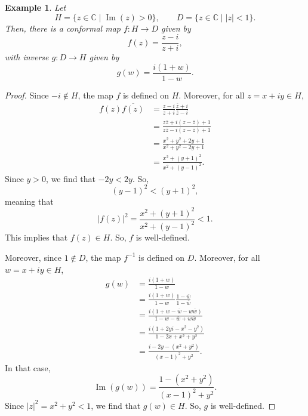 \documentclass[a4paper, openany]{memoir}
\theoremstyle{definition}
\theoremstyle{plain}
\newtheorem{example}[definition]{Example}
\begin{document}
\begin{example}
    Let
    \[H = \{z \in \mathbb{C} \mid \operatorname{Im}(z) > 0\}, \qquad D = \{z \in \mathbb{C} \mid |z| < 1\}.\]
    Then, there is a conformal map $f: H \to D$ given by
    \[f(z) = \frac{z - i}{z + i},\]
    with inverse $g: D \to H$ given by
    \[g(w) = \frac{i(1 + w)}{1 - w}.\]
\end{example}
\begin{proof}
    Since $-i \not\in H$, the map $f$ is defined on $H$. Moreover, for all $z = x + iy \in H$,
    \begin{align*}
        f(z) \overline{f(z)} &= \frac{z - i}{z + i} \frac{\overline{z} + i}{\overline{z} - i} \\
        &= \frac{z\overline{z} + i (z - \overline{z}) + 1}{z\overline{z} - i(z - \overline{z}) + 1} \\
        &= \frac{x^2 + y^2 + 2y + 1}{x^2 + y^2 - 2y + 1} \\
        &= \frac{x^2 + (y + 1)^2}{x^2 + (y - 1)^2}.
    \end{align*}
    Since $y > 0$, we find that $-2y < 2y$. So,
    \[(y - 1)^2 < (y + 1)^2,\]
    meaning that
    \[|f(z)|^2 = \frac{x^2 + (y + 1)^2}{x^2 + (y - 1)^2} < 1.\]
    This implies that $f(z) \in H$. So, $f$ is well-defined.

    Moreover, since $1 \not\in D$, the map $f^{-1}$ is defined on $D$. Moreover, for all $w = x + iy \in H$,
    \begin{align*}
        g(w) &= \frac{i(1 + w)}{1 - w} \\
        &= \frac{i(1 + w)}{1 - w} \frac{1 - \overline{w}}{1 - \overline{w}} \\
        &= \frac{i(1 + w - \overline{w} - w\overline{w})}{1 - w - \overline{w} + w\overline{w}} \\
        &= \frac{i(1 + 2yi - x^2 - y^2)}{1 - 2x + x^2 + y^2} \\
        &= \frac{i - 2y - (x^2 + y^2)}{(x - 1)^2 + y^2}.
    \end{align*}
    In that case,
    \[\operatorname{Im} (g(w)) = \frac{1 - (x^2 + y^2)}{(x- 1)^2 + y^2}.\]
    Since $|z|^2 = x^2 + y^2 < 1$, we find that $g(w) \in H$. So, $g$ is well-defined.
    

\end{proof}
\end{document}
